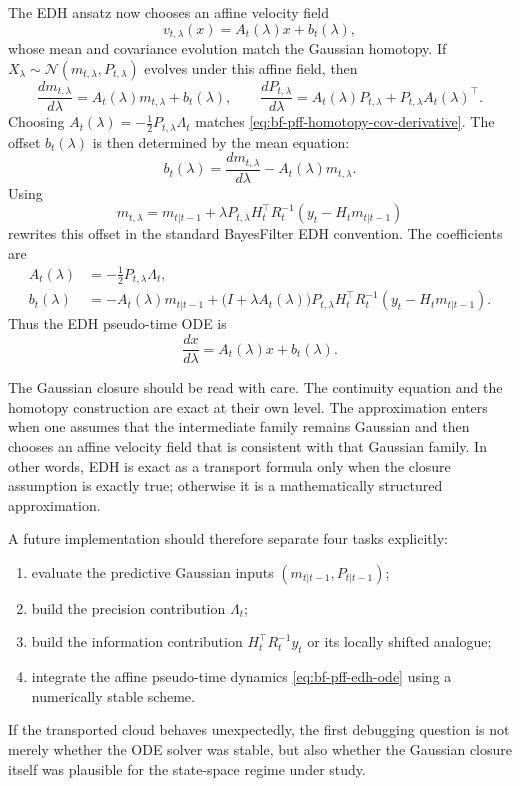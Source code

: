The EDH ansatz now chooses an affine velocity field
\begin{equation}
\label{eq:bf-pff-edh-velocity}
  v_{t,\lambda}(x) = A_t(\lambda)x + b_t(\lambda),
\end{equation}
whose mean and covariance evolution match the Gaussian homotopy.  If
$X_\lambda\sim\mathcal N(m_{t,\lambda},P_{t,\lambda})$ evolves under this
affine field, then
\[
  \frac{dm_{t,\lambda}}{d\lambda}
  =
  A_t(\lambda)m_{t,\lambda}+b_t(\lambda),
  \qquad
  \frac{dP_{t,\lambda}}{d\lambda}
  =
  A_t(\lambda)P_{t,\lambda}
  +
  P_{t,\lambda}A_t(\lambda)^\top.
\]
Choosing
$A_t(\lambda)=-\frac{1}{2}P_{t,\lambda}\Lambda_t$ matches
\eqref{eq:bf-pff-homotopy-cov-derivative}.  The offset $b_t(\lambda)$ is then
determined by the mean equation:
\[
  b_t(\lambda)
  =
  \frac{dm_{t,\lambda}}{d\lambda}
  - A_t(\lambda)m_{t,\lambda}.
\]
Using
\[
  m_{t,\lambda}
  =
  m_{t|t-1}
  + \lambda P_{t,\lambda}H_t^\top R_t^{-1}
    (y_t-H_tm_{t|t-1})
\]
rewrites this offset in the standard BayesFilter EDH convention.  The
coefficients are
\begin{align}
\label{eq:bf-pff-edh-A}
  A_t(\lambda)
  &= -\frac{1}{2} P_{t,\lambda}\Lambda_t, \\
\label{eq:bf-pff-edh-b}
  b_t(\lambda)
  &= -A_t(\lambda)m_{t|t-1}
     + \bigl(I + \lambda A_t(\lambda)\bigr)
       P_{t,\lambda}H_t^\top R_t^{-1}
       (y_t - H_t m_{t|t-1}).
\end{align}
Thus the EDH pseudo-time ODE is
\begin{equation}
\label{eq:bf-pff-edh-ode}
  \frac{dx}{d\lambda} = A_t(\lambda)x + b_t(\lambda).
\end{equation}

The Gaussian closure should be read with care.  The continuity equation and the
homotopy construction are exact at their own level.  The approximation enters
when one assumes that the intermediate family remains Gaussian and then chooses
an affine velocity field that is consistent with that Gaussian family.  In other
words, EDH is exact as a transport formula only when the closure assumption is
exactly true; otherwise it is a mathematically structured approximation.

A future implementation should therefore separate four tasks explicitly:
\begin{enumerate}[label=(\roman*)]
  \item evaluate the predictive Gaussian inputs $(m_{t|t-1},P_{t|t-1})$;
  \item build the precision contribution $\Lambda_t$;
  \item build the information contribution $H_t^\top R_t^{-1}y_t$ or its
    locally shifted analogue;
  \item integrate the affine pseudo-time dynamics
    \eqref{eq:bf-pff-edh-ode} using a numerically stable scheme.
\end{enumerate}
If the transported cloud behaves unexpectedly, the first debugging question is
not merely whether the ODE solver was stable, but also whether the Gaussian
closure itself was plausible for the state-space regime under study.

